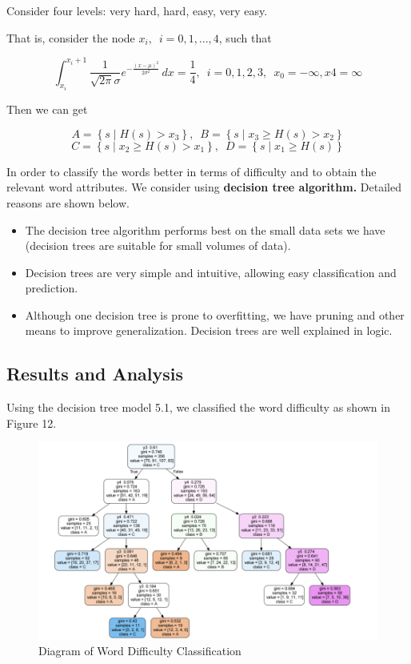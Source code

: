 \documentclass[12pt]{article}
\begin{document}
Consider four levels: very hard, hard, easy, very easy.

That is, consider the node $x_i,\enspace i = 0,1,... ,4$, such that

\begin{equation}
    \int_{x_i}^{x_i+1}\frac{1}{\sqrt{2 \pi }\sigma}e^{-\frac{(x-\mu)^2}{2\sigma^2}}  \,dx = \frac14, \enspace i = 0,1,2,3,\enspace x_0 = - \infty, x4 = \infty
\end{equation} 

Then we can get

\begin{equation}
    A = \left\{s\mid H(s) > x_3 \right\},\enspace B = \left\{s\mid x_3 \geq H(s) > x_2 \right\} 
\end{equation} 
\begin{equation}
    C = \left\{s\mid x_2 \geq H(s) > x_1 \right\}, \enspace D = \left\{s\mid x_1 \geq H(s)  \right\}
\end{equation} 
\vspace{-0.1mm}

In order to classify the words better in terms of difficulty and to obtain the relevant word attributes. We consider using \textbf{decision tree algorithm.}
Detailed reasons are shown below.
\begin{itemize}
    \setlength{\parskip}{0.2pt}
    \item The decision tree algorithm performs best on the small data sets we have (decision trees are suitable for small volumes of data).
    \item Decision trees are very simple and intuitive, allowing easy classification and prediction. 
    \item Although one decision tree is prone to overfitting, we have pruning and other means to improve generalization. Decision trees are well explained in logic.
\end{itemize}


\subsection{Results and Analysis}

Using the decision tree model 5.1, we classified the word difficulty as shown in Figure 12.

\begin{figure}[H]
    \centering
    \includegraphics[scale=0.6]{3_2.png}
    \caption{Diagram of Word Difficulty Classification}
\end{figure}
\end{document}
